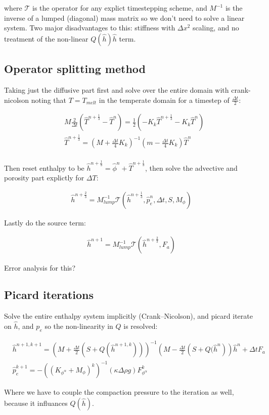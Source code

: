 \documentclass[a4paper,12pt]{article}
\begin{document}
where $\mathcal{T}$ is the operator for any explict timestepping scheme, and $M^{-1}$ is the inverse of a lumped (diagonal) mass matrix so we don't need to solve a linear system. Two major disadvantages to this: stiffness with $\Delta x^2$ scaling, and no treatment of the non-linear $Q(\hat{h})\hat{h}$ term.

\subsection{Operator splitting method}

Taking just the diffusive part first and solve over the entire domain with crank-nicolson noting that $T = T_{melt}$ in the temperate domain for a timestep of $\frac{\Delta t}{2}$:

\begin{align*}
  &M\frac{2}{\Delta t}\left(\hat{T}^{n + \frac{1}{3}} - \hat{T}^n\right) = \frac{1}{2}\left(-K_k\hat{T}^{n + \frac{1}{3}} - K_k\hat{T}^{n}\right)\\
  &\hat{T}^{n + \frac{1}{3}} = \left(M + \frac{\Delta t}{4}K_k\right)^{-1}\left(m - \frac{\Delta t}{4}K_k\right) \hat{T}^n\\
\end{align*}

Then reset enthalpy to be $\hat{h}^{n+\frac{1}{3}} = \hat{\phi}^{n} + \hat{T}^{n+\frac{1}{3}}$, then solve the advective and porosity part explictly for $\Delta T$:

\begin{align*}
  \hat{h}^{n + \frac{2}{3}} = M_{lump}^{-1}\mathcal{T}(\hat{h}^{n + \frac{1}{3}}, \hat{p}_e^n, \Delta t,S, M_{\phi})
\end{align*}

Lastly do the source term:

\begin{align*}
  \hat{h}^{n + 1} = M_{lump}^{-1} \mathcal{T}(\hat{h}^{n + \frac{2}{3}}, F_a)
\end{align*}

Error analysis for this?


\subsection{Picard iterations}

Solve the entire enthalpy system implicitly (Crank–Nicolson), and picard iterate on $\hat{h}$, and $p_e$ so the non-linearity in $Q$ is resolved:

\begin{align*}
  &\hat{h}^{n+1, k+1} = \left(M + \frac{\Delta t}{2} \left( S + Q(\hat{h}^{n+1, k})\right)\right)^{-1}\left(M - \frac{\Delta t}{2}\left(S + Q(\hat{h}^n\right)\right)\hat{h}^n + \Delta t F_a\\
  &\hat{p}_e^{k+1} = -((K_{\phi^\alpha} + M_\phi)^k)^{-1}(\kappa\Delta\rho g) F_{\phi^\alpha}^k
\end{align*}

Where we have to couple the compaction pressure to the iteration as well, because it influances $Q(\hat{h})$.
\end{document}
